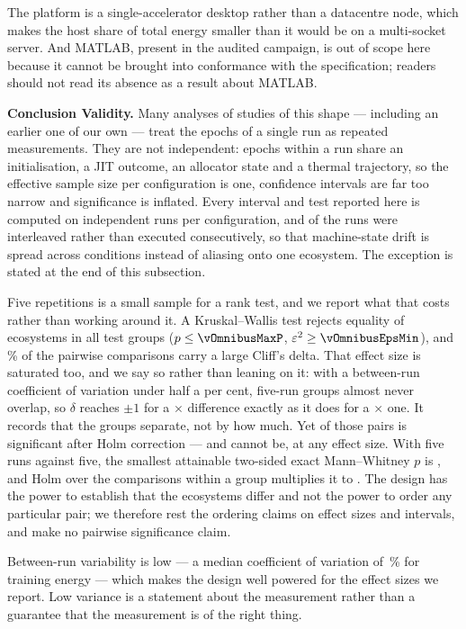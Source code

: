 The platform is a single-accelerator desktop rather than a datacentre node,
which makes the host share of total energy smaller than it would be on a
multi-socket server. And MATLAB, present in the audited campaign, is out of scope here because it cannot be brought into conformance
with the specification; readers should not read its absence as a result about
MATLAB.

\textbf{Conclusion Validity.}
Many analyses of studies of this shape --- including an earlier one of our own
--- treat the epochs of a single run as repeated measurements. They are
not independent: epochs within a run share an initialisation, a JIT outcome, an
allocator state and a thermal trajectory, so the effective sample size per
configuration is one, confidence intervals are far too narrow and significance
is inflated. Every interval and test reported here is computed on
\vRepetitions{} independent runs per configuration, and
\vInterleavedRuns{} of the \vRuns{} runs were interleaved rather than executed
consecutively, so that machine-state drift is spread across conditions instead
of aliasing onto one ecosystem. The exception is stated at the end of this
subsection.

Five repetitions is a small sample for a rank test, and we report what that
costs rather than working around it. A Kruskal--Wallis test rejects equality of
ecosystems in all \vOmnibusBlocks{} test groups ($p \le \vOmnibusMaxP$,
$\varepsilon^2 \ge \vOmnibusEpsMin$), and \vPairsLargePct\,\% of the
\vPairsTotal{} pairwise comparisons carry a large Cliff's delta. That effect
size is saturated too, and we say so rather than leaning on it: with a
between-run coefficient of variation under half a per cent, five-run groups
almost never overlap, so $\delta$ reaches $\pm 1$ for a \vCtrlSpreadVggMin$\times$
difference exactly as it does for a \vSpreadInferMax$\times$ one. It records
that the groups separate, not by how much. Yet
\vPairsSignificant{} of those \vPairsTotal{} pairs is significant after Holm
correction --- and cannot be, at any effect size. With five runs against five,
the smallest attainable two-sided exact Mann--Whitney $p$ is \vPairsMinRawP, and
Holm over the \vPairsPerBlock{} comparisons within a group multiplies it to
\vPairsMinHolmP. The design has the power to establish
that the ecosystems differ and not the power to order any particular pair; we
therefore rest the ordering claims on effect sizes and intervals, and make no
pairwise significance claim.

Between-run variability is low --- a median coefficient of variation of
\vCVTrainMedian\,\% for training energy --- which makes the design well powered
for the effect sizes we report. Low variance is a statement about the
measurement rather than a guarantee that the measurement is of the right
thing.

